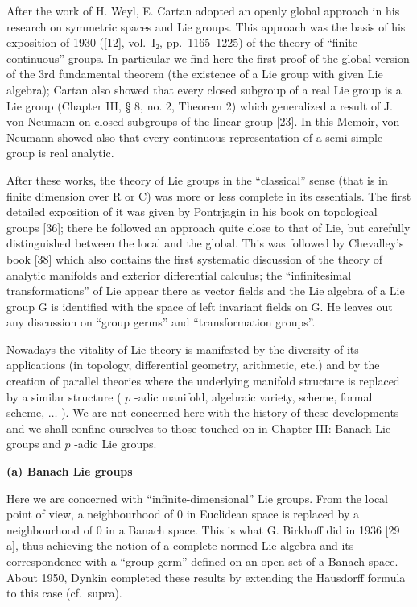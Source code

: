 After the work of H. Weyl, E. Cartan adopted an openly global approach in his research on symmetric spaces and Lie groups. This approach was the basis of his exposition of 1930 ({[}12{]}, vol.~I₂, pp.~1165--1225) of the theory of ``finite continuous'' groups. In particular we find here the first proof of the global version of the 3rd fundamental theorem (the existence of a Lie group with given Lie algebra); Cartan also showed that every closed subgroup of a real Lie group is a Lie group (Chapter III, § 8, no. 2, Theorem 2) which generalized a result of J. von Neumann on closed subgroups of the linear group {[}23{]}. In this Memoir, von Neumann showed also that every continuous representation of a semi-simple group is real analytic.

After these works, the theory of Lie groups in the ``classical'' sense (that is in finite dimension over R or C) was more or less complete in its essentials. The first detailed exposition of it was given by Pontrjagin in his book on topological groups {[}36{]}; there he followed an approach quite close to that of Lie, but carefully distinguished between the local and the global. This was followed by Chevalley's book {[}38{]} which also contains the first systematic discussion of the theory of analytic manifolds and exterior differential calculus; the ``infinitesimal transformations'' of Lie appear there as vector fields and the Lie algebra of a Lie group G is identified with the space of left invariant fields on G. He leaves out any discussion on ``group germs'' and ``transformation groups''.


Nowadays the vitality of Lie theory is manifested by the diversity of its applications (in topology, differential geometry, arithmetic, etc.) and by the creation of parallel theories where the underlying manifold structure is replaced by a similar structure ( \(p\) -adic manifold, algebraic variety, scheme, formal scheme, \(\ldots\) ). We are not concerned here with the history of these developments and we shall confine ourselves to those touched on in Chapter III: Banach Lie groups and \(p\) -adic Lie groups.

\textbf{(a) Banach Lie groups}

Here we are concerned with ``infinite-dimensional'' Lie groups. From the local point of view, a neighbourhood of 0 in Euclidean space is replaced by a neighbourhood of 0 in a Banach space. This is what G. Birkhoff did in 1936 {[}29 a{]}, thus achieving the notion of a complete normed Lie algebra and its correspondence with a ``group germ'' defined on an open set of a Banach space. About 1950, Dynkin completed these results by extending the Hausdorff formula to this case (cf.~supra).

